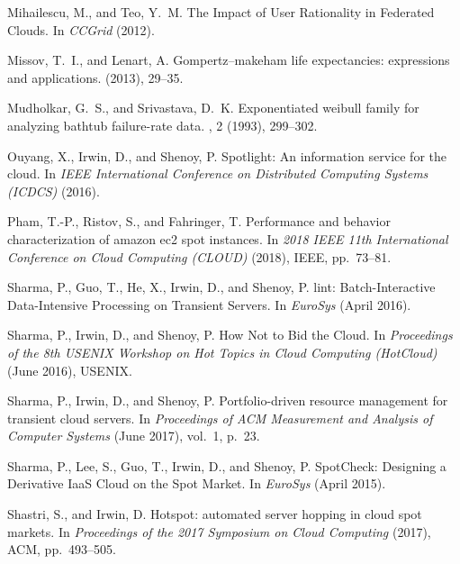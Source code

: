 \documentclass[sigconf]{acmart} %
\begin{document}
\begin{thebibliography}{10}
{\sc Mihailescu, M., and Teo, Y.~M.}
\newblock The {I}mpact of {U}ser {R}ationality in {F}ederated {C}louds.
\newblock In {\em CCGrid\/} (2012).

{\sc Missov, T.~I., and Lenart, A.}
\newblock Gompertz--makeham life expectancies: expressions and applications.
 (2013), 29--35.

{\sc Mudholkar, G.~S., and Srivastava, D.~K.}
\newblock Exponentiated weibull family for analyzing bathtub failure-rate data.
, 2 (1993), 299--302.

{\sc Ouyang, X., Irwin, D., and Shenoy, P.}
\newblock Spotlight: An information service for the cloud.
\newblock In {\em IEEE International Conference on Distributed Computing
  Systems (ICDCS)\/} (2016).

{\sc Pham, T.-P., Ristov, S., and Fahringer, T.}
\newblock Performance and behavior characterization of amazon ec2 spot
  instances.
\newblock In {\em 2018 IEEE 11th International Conference on Cloud Computing
  (CLOUD)\/} (2018), IEEE, pp.~73--81.

{\sc Sharma, P., Guo, T., He, X., Irwin, D., and Shenoy, P.}
lint: {B}atch-{I}nteractive {D}ata-{I}ntensive {P}rocessing on
  {T}ransient {S}ervers.
\newblock In {\em EuroSys\/} (April 2016).

{\sc Sharma, P., Irwin, D., and Shenoy, P.}
\newblock How {N}ot to {B}id the {C}loud.
\newblock In {\em Proceedings of the 8th USENIX Workshop on Hot Topics in Cloud
  Computing (HotCloud)\/} (June 2016), USENIX.

{\sc Sharma, P., Irwin, D., and Shenoy, P.}
\newblock Portfolio-driven resource management for transient cloud servers.
\newblock In {\em Proceedings of ACM Measurement and Analysis of Computer
  Systems\/} (June 2017), vol.~1, p.~23.

{\sc Sharma, P., Lee, S., Guo, T., Irwin, D., and Shenoy, P.}
\newblock Spot{C}heck: Designing a {D}erivative {I}aa{S} {C}loud on the {S}pot
  {M}arket.
\newblock In {\em EuroSys\/} (April 2015).

{\sc Shastri, S., and Irwin, D.}
\newblock Hotspot: automated server hopping in cloud spot markets.
\newblock In {\em Proceedings of the 2017 Symposium on Cloud Computing\/}
  (2017), ACM, pp.~493--505.


\end{thebibliography}
\end{document}
